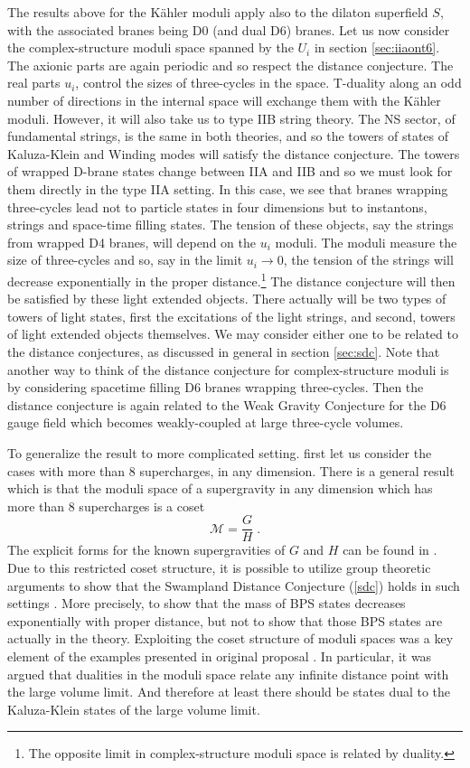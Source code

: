 \documentclass[11pt,a4paper]{article}
\numberwithin{equation}{section}
\numberwithin{table}{section}\setlength{\multlinegap}{25pt}
\newcommand{\cM}{\mathcal M}
\newcommand{\be}{\begin{equation}}
\newcommand{\ee}{\end{equation}}
\begin{document}
The results above for the K{\"a}hler moduli apply also to the dilaton superfield $S$, with the associated branes being D0 (and dual D6) branes. Let us now consider the complex-structure moduli space spanned by the $U_i$ in section \ref{sec:iiaont6}. The axionic parts are again periodic and so respect the distance conjecture. The real parts $u_i$, control the sizes of three-cycles in the space. T-duality along an odd number of directions in the internal space will exchange them with the K{\"a}hler moduli. However, it will also take us to type IIB string theory. The NS sector, of fundamental strings, is the same in both theories, and so the towers of states of Kaluza-Klein and Winding modes will satisfy the distance conjecture. The towers of wrapped D-brane states change between IIA and IIB and so we must look for them directly in the type IIA setting. In this case, we see that branes wrapping three-cycles lead not to particle states in four dimensions but to instantons, strings and space-time filling states. The tension of these objects, say the strings from wrapped D4 branes, will depend on the $u_i$ moduli. The moduli measure the size of three-cycles and so, say in the limit $u_i \rightarrow 0$, the tension of the strings will decrease exponentially in the proper distance.\footnote{The opposite limit in complex-structure moduli space is related by duality.} The distance conjecture will then be satisfied by these light extended objects. There actually will be two types of towers of light states, first the excitations of the light strings, and second, towers of light extended objects themselves. We may consider either one to be related to the distance conjectures, as discussed in general in section \ref{sec:sdc}. Note that another way to think of the distance conjecture for complex-structure moduli is by considering spacetime filling D6 branes wrapping three-cycles. Then the distance conjecture is again related to the Weak Gravity Conjecture for the D6 gauge field which becomes weakly-coupled at large three-cycle volumes.																																																									

To generalize the result to more complicated setting. first let us consider the cases with more than 8 supercharges, in any dimension. There is a general result which is that the moduli space of a supergravity in any dimension which has more than 8 supercharges is a coset 
\be
\cM = \frac{G}{H} \;.
\ee
The explicit forms for the known supergravities of $G$ and $H$ can be found in \cite{Cecotti:2015wqa}. Due to this restricted coset structure, it is possible to utilize group theoretic arguments to show that the Swampland Distance Conjecture (\ref{sdc}) holds in such settings \cite{Cecotti:2015wqa}. More precisely, to show that the mass of BPS states decreases exponentially with proper distance, but not to show that those BPS states are actually in the theory. Exploiting the coset structure of moduli spaces was a key element of the examples presented in original proposal \cite{Ooguri:2006in}. In particular, it was argued that dualities in the moduli space relate any infinite distance point with the large volume limit. And therefore at least there should be states dual to the Kaluza-Klein states of the large volume limit. 
\end{document}
